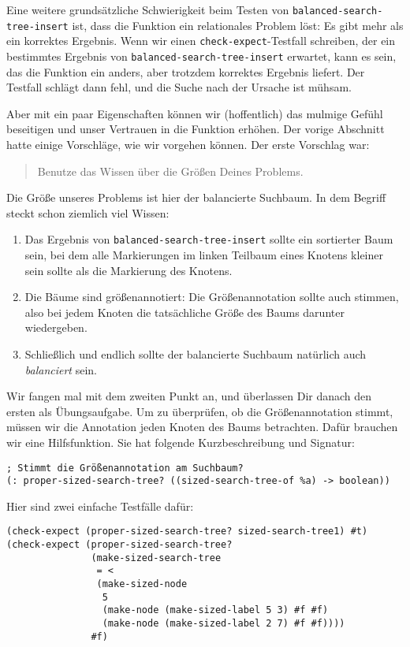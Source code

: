 Eine weitere grundsätzliche Schwierigkeit beim Testen von
\lstinline{balanced-search-tree-insert} ist, dass die Funktion ein
relationales Problem löst: Es gibt mehr als ein korrektes
Ergebnis. Wenn wir einen \lstinline{check-expect}-Testfall schreiben,
der ein bestimmtes Ergebnis von
\lstinline{balanced-search-tree-insert} erwartet, kann es sein, das
die Funktion ein anders, aber trotzdem korrektes Ergebnis liefert.
Der Testfall schlägt dann fehl, und die Suche nach der Ursache ist
mühsam.

Aber mit ein paar Eigenschaften können wir (hoffentlich) das mulmige
Gefühl beseitigen und unser Vertrauen in die Funktion erhöhen.  Der
vorige Abschnitt hatte einige Vorschläge, wie wir vorgehen können.
Der erste Vorschlag war:
%
\begin{quote}
  Benutze das Wissen über die Größen Deines Problems.
\end{quote}
%
Die Größe unseres Problems ist hier der balancierte Suchbaum.  In dem
Begriff steckt schon ziemlich viel Wissen:
%
\begin{enumerate}
\item Das Ergebnis von \lstinline{balanced-search-tree-insert} sollte ein
  sortierter Baum sein, bei dem alle Markierungen im linken Teilbaum
  eines Knotens kleiner sein sollte als die Markierung des Knotens.
\item Die Bäume sind größenannotiert: Die Größenannotation sollte auch
  stimmen, also bei jedem Knoten die tatsächliche Größe des Baums
  darunter wiedergeben.
\item Schließlich und endlich sollte der balancierte Suchbaum
  natürlich auch \emph{balanciert} sein.
\end{enumerate}
%
Wir fangen mal mit dem zweiten Punkt an, und überlassen Dir danach den
ersten als Übungsaufgabe.  Um zu überprüfen, ob die Größenannotation
stimmt, müssen wir die Annotation jeden Knoten des Baums betrachten.
Dafür brauchen wir eine Hilfsfunktion.  Sie hat folgende
Kurzbeschreibung und Signatur:
%
\begin{lstlisting}
; Stimmt die Größenannotation am Suchbaum?
(: proper-sized-search-tree? ((sized-search-tree-of %a) -> boolean))
\end{lstlisting}
%
Hier sind zwei einfache Testfälle dafür:
%
\begin{lstlisting}
(check-expect (proper-sized-search-tree? sized-search-tree1) #t)
(check-expect (proper-sized-search-tree?
               (make-sized-search-tree
                = <
                (make-sized-node
                 5
                 (make-node (make-sized-label 5 3) #f #f)
                 (make-node (make-sized-label 2 7) #f #f))))
               #f)
\end{lstlisting}              
